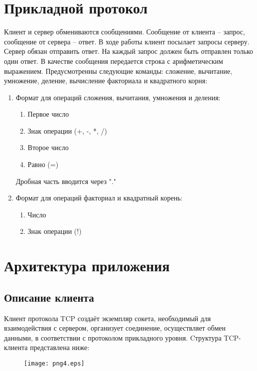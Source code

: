 \documentclass[12pt,a4paper]{report}
\begin{document}
\section{Прикладной протокол}
\label{protocol_tcp}
Клиент и сервер обмениваются сообщениями. Сообщение от клиента – запрос, сообщение от сервера – ответ. В ходе работы клиент посылает запросы серверу. Сервер обязан отправить ответ. На каждый запрос должен быть отправлен только один ответ. В качестве сообщения передается строка с арифметическим выражением. Предусмотренны следующие команды: сложение, вычитание, умножение, деление, вычисление факториала и квадратного корня:
\begin{enumerate}
\item{Формат для операций сложения, вычитания, умножения и деления:  }\\
\begin{enumerate}
\item{Первое число}\\
\item{Знак операции (+, -, *, /)}\\
\item{Второе число}\\
\item{Равно (=)}\\
\end{enumerate}
Дробная часть вводится через "."\\
\item{Формат для операций факториал и квадратный корень:} \\
\begin{enumerate}
\item{Число} \\
\item{Знак операции} (!)\\
\end{enumerate}
\end{enumerate}
\section{Архитектура приложения}
\subsection{Описание клиента}
Клиент  протокола TCP  создаёт  экземпляр  сокета,  необходимый  для
взаимодействия  с  сервером,  организует  соединение,  осуществляет  обмен
данными, в соответствии с протоколом прикладного уровня. Cтруктура TCP-клиента представлена ниже:\\
\begin{figure}[htb]
\centering
\texttt{[image: png4.eps]}
\end{figure}
\end{document}

